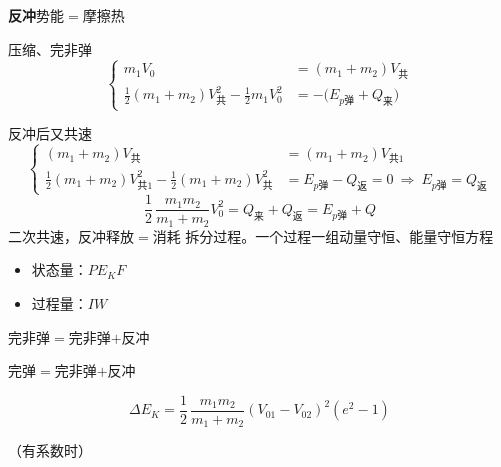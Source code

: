 \textbf{反冲}\quad 势能$=$摩擦热

压缩、完非弹
\[
\left\{\begin{aligned}
m_1V_0&=(m_1+m_2)V_{\text{共}}\\
\tfrac12(m_1+m_2)V_{\text{共}}^2-\tfrac12m_1V_0^2&=-\bigl(E_{p\text{弹}}+Q_{\text{来}}\bigr)
\end{aligned}\right.
\]

反冲后又共速
\[
\left\{\begin{aligned}
(m_1+m_2)V_{\text{共}}&=(m_1+m_2)V_{\text{共}1}\\
\tfrac12(m_1+m_2)V_{\text{共}1}^2-\tfrac12(m_1+m_2)V_{\text{共}}^2&=E_{p\text{弹}}-Q_{\text{返}}=0\ \Rightarrow\ E_{p\text{弹}}=Q_{\text{返}}
\end{aligned}\right.
\]
\[
\frac12\,\frac{m_1m_2}{m_1+m_2}V_0^2=Q_{\text{来}}+Q_{\text{返}}=E_{p\text{弹}}+Q
\]
二次共速，反冲\quad 释放$=$消耗
拆分过程。一个过程一组动量守恒、能量守恒方程
\begin{itemize}
\item 状态量：$P$\quad $E_K$\quad $F$
\item 过程量：$I$\quad $W$
\end{itemize}

完非弹$=$完非弹$+$反冲 %

完弹$=$完非弹$+$反冲

\begin{keybox}
\[
\Delta E_K=\frac12\,\frac{m_1m_2}{m_1+m_2}(V_{01}-V_{02})^2(e^2-1)
\]
\end{keybox}
（有系数时）

